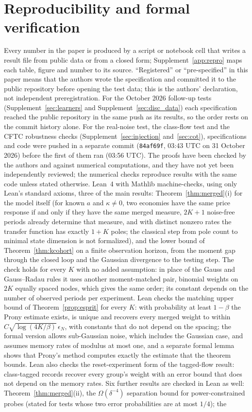 \documentclass[12pt]{article}
\theoremstyle{definition}
\theoremstyle{remark}
\begin{document}
\section{Reproducibility and formal verification}\label{app:verification}
Every number in the paper is produced by a script or notebook cell that writes a result file from public data or from a closed form; Supplement~\ref{app:repro} maps each table, figure and number to its source. ``Registered'' or ``pre-specified'' in this paper means that the authors wrote the specification and committed it to the public repository before opening the test data; this is the authors' declaration, not independent preregistration. For the October 2026 follow-up tests (Supplement~\ref{sec:learners} and Supplement~\ref{sec:disc_data}) each specification reached the public repository in the same push as its results, so the order rests on the commit history alone. For the real-noise test, the class-flow test and the CFTC robustness checks (Supplement~\ref{sec:injection} and~\ref{sec:cot}), specifications and code were pushed in a separate commit (\texttt{84af69f}, 03:43 UTC on 31 October 2026) before the first of them ran (03:56 UTC). The proofs have been checked by the authors and against numerical computations, and they have not yet been independently reviewed; the numerical checks reproduce results with the same code unless stated otherwise. Lean~4 with Mathlib machine-checks, using only Lean's standard axioms, three of the main results: Theorem~\ref{thm:merged}(i) for the model itself (for known $a$ and $\kappa\neq0$, two economies have the same price response if and only if they have the same merged measure, $2K+1$ noise-free periods already determine that measure, and with distinct nonzero rates the transfer function has exactly $1+K$ poles; the classical step from pole count to minimal state dimension is not formalized), and the lower bound of Theorem~\ref{thm:kcohort} on a finite observation horizon, from the moment gap through the closed loop and the Gaussian divergence to the testing step. The check holds for every $K$ with no added assumption: in place of the Gauss and Gauss--Radau rules it uses another moment-matched pair, binomial weights on $2K$ equally spaced nodes, which gives the same order; its constant depends on the number of observed periods per experiment. Lean checks the matching upper bound of Theorem~\ref{prop:esprit} for every $K$: with probability at least $1-\beta$ the Prony estimate exists, is unique and recovers every merged weight to within $C\sqrt{\log(4K/\beta)}\,\epsilon_N$, with constants that do not depend on the spacing; the formal version allows sub-Gaussian noise, which includes the Gaussian case, and assumes memory rates of modulus at most one, and a separate formal lemma shows that Prony's method computes exactly the estimate that the theorem bounds. Lean also checks the reset-experiment form of the tagged-flow result: class-tagged records recover every group's weight with an error bound that does not depend on the memory rates. Six further results are checked in Lean as well: Theorem~\ref{thm:merged}(ii), the $\Omega(\delta^{-4})$ separation bound for power-constrained probes (stated for tests whose two error probabilities are at most $1/4$); the 
\end{document}
